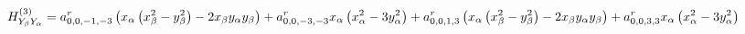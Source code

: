 \documentclass[fleqn]{article}
\begin{document}
\begin{dmath*}
H_{Y_{\beta}Y_{\alpha}}^{(3)}= a^{r}_{0,0,-1,-3} \left(x_{\alpha} \left(x_{\beta}^{2} - y_{\beta}^{2}\right) - 2 x_{\beta} y_{\alpha} y_{\beta}\right) +  a^{r}_{0,0,-3,-3} x_{\alpha} \left(x_{\alpha}^{2} - 3 y_{\alpha}^{2}\right) +  a^{r}_{0,0,1,3} \left(x_{\alpha} \left(x_{\beta}^{2} - y_{\beta}^{2}\right) - 2 x_{\beta} y_{\alpha} y_{\beta}\right) +  a^{r}_{0,0,3,3} x_{\alpha} \left(x_{\alpha}^{2} - 3 y_{\alpha}^{2}\right)\\
\end{dmath*}
\end{document}
